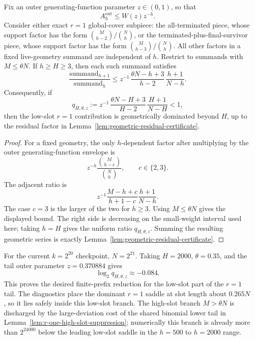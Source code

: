 \begin{lemma}[Low-slot \(r=1\) geometric ratio]
\label{lem:r-one-low-slot-ratio}
Fix an outer generating-function parameter \(z\in(0,1)\), so that
\[
A_h^{\mathrm{out}}\le W(z)z^{-h}.
\]
Consider either exact \(r=1\) global-cover subpiece: the all-terminated piece, whose support factor has the form
\(\binom{M}{h-2}/\binom{N}{h}\), or the terminated-plus-final-survivor piece, whose support factor has the form
\(\binom{M}{h-3}/\binom{N}{h}\).  All other factors in a fixed live-geometry summand are independent of \(h\).
Restrict to summands with \(M\le \theta N\).  If \(h\ge H\ge3\), then each such summand satisfies
\[
\frac{\text{summand}_{h+1}}{\text{summand}_{h}}
\le
z^{-1}\,
\frac{\theta N-h+3}{h-2}\,
\frac{h+1}{N-h}.
\]
Consequently, if
\[
q_{H,\theta,z}
:=
z^{-1}\,
\frac{\theta N-H+3}{H-2}\,
\frac{H+1}{N-H}
<1,
\]
then the low-slot \(r=1\) contribution is geometrically dominated beyond \(H\), up to the residual factor in
Lemma~\ref{lem:geometric-residual-certificate}.
\end{lemma}

\begin{proof}
For a fixed geometry, the only \(h\)-dependent factor after multiplying by the outer generating-function envelope is
\[
z^{-h}\frac{\binom{M}{h-c}}{\binom{N}{h}},
\qquad c\in\{2,3\}.
\]
The adjacent ratio is
\[
z^{-1}
\frac{M-h+c}{h+1-c}
\frac{h+1}{N-h}.
\]
The case \(c=3\) is the larger of the two for \(h\ge3\).  Using \(M\le\theta N\) gives the displayed bound.  The right
side is decreasing on the small-weight interval used here; taking \(h=H\) gives the uniform ratio \(q_{H,\theta,z}\).
Summing the resulting geometric series is exactly Lemma~\ref{lem:geometric-residual-certificate}.
\end{proof}

For the current \(k=2^{20}\) checkpoint, \(N=2^{21}\).  Taking \(H=2000\), \(\theta=0.35\), and the tail outer
parameter \(z=0.370884\) gives
\[
\log_2 q_{H,\theta,z}\approx -0.084.
\]
This proves the desired finite-prefix reduction for the low-slot part of the \(r=1\) tail.  The diagnostics place the
dominant \(r=1\) saddle at slot length about \(0.265N\), so it lies safely inside this low-slot branch.  The high-slot
branch \(M>\theta N\) is discharged by the large-deviation cost of the shared binomial lower tail in
Lemma~\ref{lem:r-one-high-slot-suppression}; numerically this branch is already more than \(2^{24000}\) below the
leading low-slot saddle in the \(h=500\) to \(h=2000\) range.

